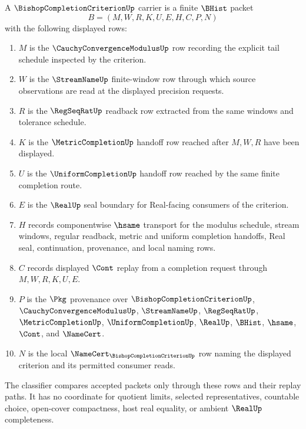 \begin{definition}
\label{def:bishop-completion-criterion-carrier}
A $\BishopCompletionCriterionUp$ carrier is a finite $\BHist$ packet
$$
B=(M,W,R,K,U,E,H,C,P,N)
$$
with the following displayed rows:
\begin{enumerate}
\item $M$ is the $\CauchyConvergenceModulusUp$ row recording the explicit tail schedule inspected by the criterion.
\item $W$ is the $\StreamNameUp$ finite-window row through which source observations are read at the displayed precision requests.
\item $R$ is the $\RegSeqRatUp$ readback row extracted from the same windows and tolerance schedule.
\item $K$ is the $\MetricCompletionUp$ handoff row reached after $M,W,R$ have been displayed.
\item $U$ is the $\UniformCompletionUp$ handoff row reached by the same finite completion route.
\item $E$ is the $\RealUp$ seal boundary for Real-facing consumers of the criterion.
\item $H$ records componentwise $\hsame$ transport for the modulus schedule, stream windows, regular readback, metric and uniform completion handoffs, Real seal, continuation, provenance, and local naming rows.
\item $C$ records displayed $\Cont$ replay from a completion request through $M,W,R,K,U,E$.
\item $P$ is the $\Pkg$ provenance over $\BishopCompletionCriterionUp$, $\CauchyConvergenceModulusUp$, $\StreamNameUp$, $\RegSeqRatUp$, $\MetricCompletionUp$, $\UniformCompletionUp$, $\RealUp$, $\BHist$, $\hsame$, $\Cont$, and $\NameCert$.
\item $N$ is the local $\NameCert_{\BishopCompletionCriterionUp}$ row naming the displayed criterion and its permitted consumer reads.
\end{enumerate}
The classifier compares accepted packets only through these rows and their replay paths. It has no coordinate for quotient limits, selected representatives, countable choice, open-cover compactness, host real equality, or ambient $\RealUp$ completeness.
\end{definition}

